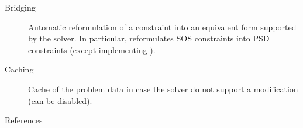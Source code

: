 \documentclass[final]{beamer}
\newlength{\onecolwid}
\begin{document}
\begin{frame}[t,fragile]
\begin{columns}[t]
\begin{column}{\onecolwid}
\begin{center}
\begin{tikzpicture}[scale=3]
  \end{tikzpicture}
  \end{center}
  \begin{description}
    \item[Bridging] Automatic reformulation of a constraint into an equivalent
      form supported by the solver. In particular, reformulates SOS constraints
      into PSD constraints (except  implementing \cite{papp2017sum}).
    \item[Caching] Cache of the problem data in case
      the solver do not support a modification (can be disabled).
  \end{description}

  \begin{block}{References}
    \printbibliography
  \end{block}


\end{column}
\end{columns}
\end{frame}
\end{document}
